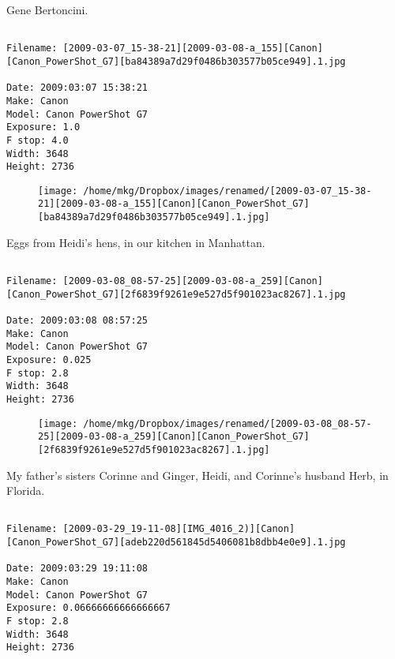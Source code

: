 \clearpage
\onecolumn
\noindent Gene Bertoncini.
\noindent
\begin{lstlisting}

Filename: [2009-03-07_15-38-21][2009-03-08-a_155][Canon][Canon_PowerShot_G7][ba84389a7d29f0486b303577b05ce949].1.jpg

Date: 2009:03:07 15:38:21
Make: Canon
Model: Canon PowerShot G7
Exposure: 1.0
F stop: 4.0
Width: 3648
Height: 2736
\end{lstlisting}
\clearpage

\begin{figure}
\texttt{[image: /home/mkg/Dropbox/images/renamed/[2009-03-07\_15-38-21][2009-03-08-a\_155][Canon][Canon\_PowerShot\_G7][ba84389a7d29f0486b303577b05ce949].1.jpg]}
\end{figure}
    
\clearpage
\onecolumn
\noindent Eggs from Heidi's hens, in our kitchen in Manhattan.
\noindent
\begin{lstlisting}

Filename: [2009-03-08_08-57-25][2009-03-08-a_259][Canon][Canon_PowerShot_G7][2f6839f9261e9e527d5f901023ac8267].1.jpg

Date: 2009:03:08 08:57:25
Make: Canon
Model: Canon PowerShot G7
Exposure: 0.025
F stop: 2.8
Width: 3648
Height: 2736
\end{lstlisting}
\clearpage

\begin{figure}
\texttt{[image: /home/mkg/Dropbox/images/renamed/[2009-03-08\_08-57-25][2009-03-08-a\_259][Canon][Canon\_PowerShot\_G7][2f6839f9261e9e527d5f901023ac8267].1.jpg]}
\end{figure}
    
\clearpage
\onecolumn
\noindent My father's sisters Corinne and Ginger, Heidi, and Corinne's husband Herb, in Florida.
\noindent
\begin{lstlisting}

Filename: [2009-03-29_19-11-08][IMG_4016_2)][Canon][Canon_PowerShot_G7][adeb220d561845d5406081b8dbb4e0e9].1.jpg

Date: 2009:03:29 19:11:08
Make: Canon
Model: Canon PowerShot G7
Exposure: 0.06666666666666667
F stop: 2.8
Width: 3648
Height: 2736
\end{lstlisting}
\clearpage

